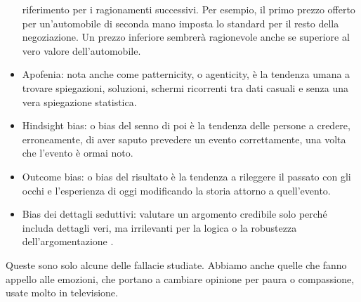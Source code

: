 \documentclass[12pt]{book} %
\begin{document}
\begin{itemize}
riferimento per i ragionamenti successivi. Per esempio, il primo prezzo offerto per un'automobile di seconda mano
imposta lo standard per il resto della negoziazione. Un prezzo inferiore sembrerà ragionevole anche se superiore al
vero valore dell'automobile.
\item Apofenia: nota anche come patternicity, o agenticity, è la tendenza umana a trovare spiegazioni, soluzioni,
schermi ricorrenti tra dati casuali e senza una vera spiegazione statistica.
\item Hindsight bias: o bias del senno di poi è la tendenza delle persone a credere, erroneamente, di aver saputo
prevedere un evento correttamente, una volta che l'evento è ormai noto. 
\item Outcome bias: o bias del risultato è la tendenza a rileggere il passato con gli occhi e
l'esperienza di oggi modificando la storia attorno a quell'evento.
\item Bias dei dettagli seduttivi: valutare un argomento credibile solo perché includa dettagli veri, ma irrilevanti per la logica o la robustezza dell’argomentazione
. 
\end{itemize}

\bigskip

Queste sono solo alcune delle fallacie studiate. Abbiamo anche quelle che fanno appello alle emozioni, che portano a
cambiare opinione per paura o compassione, usate molto in televisione.


\bigskip
\end{document}
